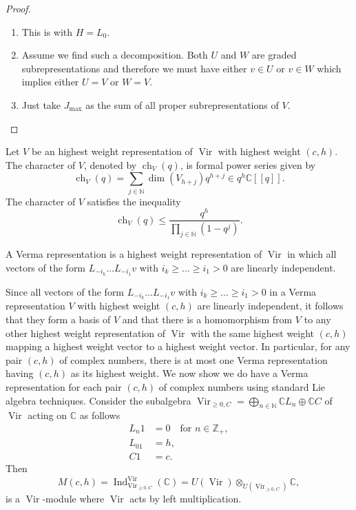 \documentclass[a4paper, 12pt, reqno]{amsart}
\theoremstyle{remark}
\numberwithin{equation}{subsection}
\DeclareMathOperator{\Vir}{Vir}
\DeclareMathOperator{\ch}{ch}
\DeclareMathOperator{\Ind}{Ind}
\begin{document}
\begin{proof}\leavevmode
  \begin{enumerate}
  \item This is  with $H = L_0$.
  \item Assume we find such a decomposition.
    Both $U$ and $W$ are graded subrepresentations and therefore we must have either $v \in U$ or $v \in W$ which implies either $U = V$ or $W = V$.
  \item Just take $J_{\max}$ as the sum of all proper subrepresentations of $V$.\qedhere
  \end{enumerate}
\end{proof}

Let $V$ be an highest weight representation of $\Vir$ with highest weight $(c, h)$.
The character of $V$, denoted by $\ch_V(q)$, is formal power series given by
\begin{equation*}
  \ch_V(q) = \sum_{j \in \mathbb{N}}\dim(V_{h + j})q^{h + j} \in q^h\mathbb{C}[[q]].
\end{equation*}
The character of $V$ satisfies the inequality
\begin{equation*}
  \ch_V(q) \le \frac{q^h}{\prod_{j \in \mathbb{N}}(1 - q^j)}.
\end{equation*}

A Verma representation is a highest weight representation of $\Vir$ in which all vectors of the form $L_{-i_k}\dots L_{-i_1}v$ with $i_k \ge \dots \ge i_1 > 0$ are linearly independent.

Since all vectors of the form $L_{-i_k}\dots L_{-i_1}v$ with $i_k \ge \dots \ge i_1 > 0$ in a Verma representation $V$ with highest weight $(c, h)$ are linearly independent, it follows that they form a basis of $V$ and that there is a homomorphism from $V$ to any other highest weight representation of $\Vir$ with the same highest weight $(c, h)$ mapping a highest weight vector to a highest weight vector.
In particular, for any pair $(c, h)$ of complex numbers, there is at most one Verma representation having $(c, h)$ as its highest weight.
We now show we do have a Verma representation for each pair $(c, h)$ of complex numbers using standard Lie algebra techniques.
Consider the subalgebra $\Vir_{\ge 0, C} = \bigoplus_{n \in \mathbb{N}}\mathbb{C}L_n\oplus \mathbb{C}C$ of $\Vir$ acting on $\mathbb{C}$ as follows
\begin{align*}
  L_n1 &= 0 \quad \text{for }n \in \mathbb{Z}_+, \\
  L_01 &= h, \\
  C1 &= c.
\end{align*}
Then
\begin{equation*}
  M(c, h) = \Ind^{\Vir}_{\Vir_{\ge 0, C}}(\mathbb{C}) = U(\Vir) \otimes_{U(\Vir_{\ge 0, C})} \mathbb{C},
\end{equation*}
is a $\Vir$-module where $\Vir$ acts by left multiplication.
\end{document}
